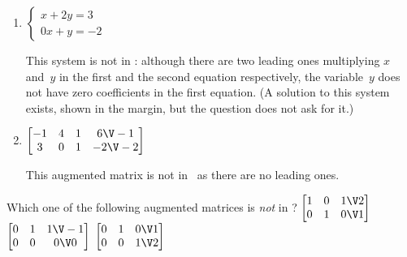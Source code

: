 \begin{example}
\begin{enumerate}[ref=\ref{eg:rref}(\alph*)]
\item \(\begin{cases} x+2y=3\\ 0x+y=-2
\end{cases}\)
\begin{solution} 
This system is not in \rref: 
%
although there are two leading ones multiplying \(x\) and~\(y\) in the first and the second equation respectively, the variable~\(y\) does not have zero coefficients in the first equation.  
(A solution to this system exists, shown  in the margin, but the question does not ask for it.)
\end{solution}

\item \(\begin{bmatrix} -1&4&1&6\V-1
\\3&0&1&-2\V-2
 \end{bmatrix}\)
\begin{solution} 
This augmented matrix is not in \rref\ as there are no leading ones. 
\end{solution}
\end{enumerate}
\end{example}



\begin{activity}
Which one of the following augmented matrices is \emph{not} in ?
{\(\begin{bmatrix} 1&0&1\V2
\\0&1&0\V1 \end{bmatrix}\)}
{\(\begin{bmatrix} 0&1&1\V-1
\\0&0&0\V0 \end{bmatrix}\)}
{\(\begin{bmatrix} 0&1&0\V1
\\0&0&1\V2 \end{bmatrix}\)}
\end{activity}






